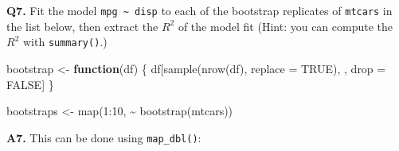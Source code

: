\documentclass[
]{book}
\newenvironment{Shaded}{\begin{snugshade}}{\end{snugshade}}
\newcommand{\AttributeTok}[1]{\textcolor[rgb]{0.77,0.63,0.00}{#1}}
\newcommand{\CommentTok}[1]{\textcolor[rgb]{0.56,0.35,0.01}{\textit{#1}}}
\newcommand{\ConstantTok}[1]{\textcolor[rgb]{0.00,0.00,0.00}{#1}}
\newcommand{\ControlFlowTok}[1]{\textcolor[rgb]{0.13,0.29,0.53}{\textbf{#1}}}
\newcommand{\DecValTok}[1]{\textcolor[rgb]{0.00,0.00,0.81}{#1}}
\newcommand{\FunctionTok}[1]{\textcolor[rgb]{0.00,0.00,0.00}{#1}}
\newcommand{\NormalTok}[1]{#1}
\newcommand{\OtherTok}[1]{\textcolor[rgb]{0.56,0.35,0.01}{#1}}
\newcommand{\SpecialCharTok}[1]{\textcolor[rgb]{0.00,0.00,0.00}{#1}}
\begin{document}
\textbf{Q7.} Fit the model \texttt{mpg\ \textasciitilde{}\ disp} to each of the bootstrap replicates of \texttt{mtcars} in the list below, then extract the \(R^2\) of the model fit (Hint: you can compute the \(R^2\) with \texttt{summary()}.)

\begin{Shaded}
\begin{Highlighting}[]
\NormalTok{bootstrap }\OtherTok{\textless{}{-}} \ControlFlowTok{function}\NormalTok{(df) \{}
\NormalTok{  df[}\FunctionTok{sample}\NormalTok{(}\FunctionTok{nrow}\NormalTok{(df), }\AttributeTok{replace =} \ConstantTok{TRUE}\NormalTok{), , drop }\OtherTok{=} \ConstantTok{FALSE}\NormalTok{]}
\NormalTok{\}}

\NormalTok{bootstraps }\OtherTok{\textless{}{-}} \FunctionTok{map}\NormalTok{(}\DecValTok{1}\SpecialCharTok{:}\DecValTok{10}\NormalTok{, }\SpecialCharTok{\textasciitilde{}} \FunctionTok{bootstrap}\NormalTok{(mtcars))}
\end{Highlighting}
\end{Shaded}

\textbf{A7.} This can be done using \texttt{map\_dbl()}:

\begin{Shaded}
\end{Shaded}
\end{document}
